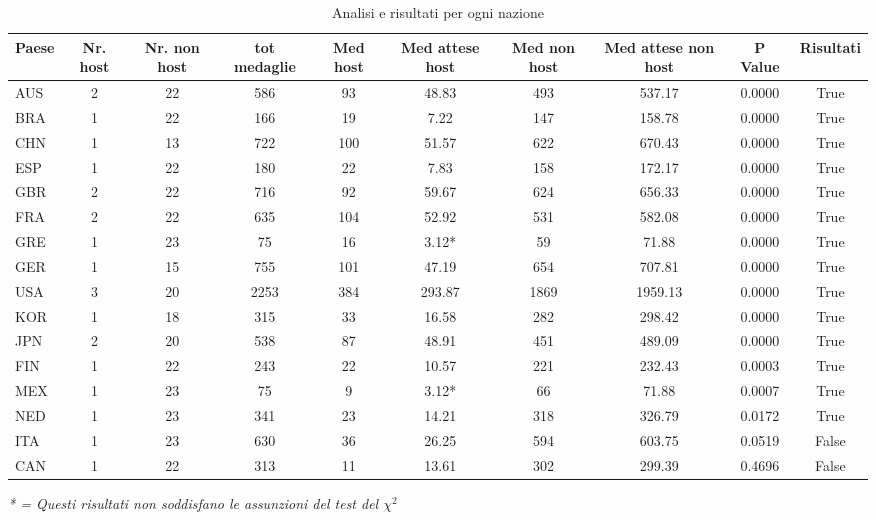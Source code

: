 \documentclass{article}
\begin{document}
\begin{table}[H]
\centering
\caption{Analisi e risultati per ogni nazione}
\label{tab:medaglie_chi2}
\small 
\setlength{\tabcolsep}{2pt} 
\begin{tabularx}{\textwidth}{@{} l *{9}{C} @{}}
\toprule
\textbf{Paese} & \textbf{Nr. host} & \textbf{Nr. non host} & \textbf{tot medaglie} 
& \textbf{Med host} & \textbf{Med attese host} & \textbf{Med non host} & 
\textbf{Med attese non host} & \textbf{P Value} & \textbf{Risultati} \\
\midrule
AUS & 2 & 22 & 586  & 93  & 48.83  & 493  & 537.17 & 0.0000 & True  \\
BRA & 1 & 22 & 166  & 19  & 7.22   & 147  & 158.78 & 0.0000 & True  \\
CHN & 1 & 13 & 722  & 100 & 51.57  & 622  & 670.43 & 0.0000 & True  \\
ESP & 1 & 22 & 180  & 22  & 7.83   & 158  & 172.17 & 0.0000 & True  \\
GBR & 2 & 22 & 716  & 92  & 59.67  & 624  & 656.33 & 0.0000 & True  \\
FRA & 2 & 22 & 635  & 104 & 52.92  & 531  & 582.08 & 0.0000 & True  \\
GRE & 1 & 23 & 75   & 16  & 3.12*  & 59   & 71.88  & 0.0000 & True  \\
GER & 1 & 15 & 755  & 101 & 47.19  & 654  & 707.81 & 0.0000 & True  \\
USA & 3 & 20 & 2253 & 384 & 293.87 & 1869 & 1959.13& 0.0000 & True  \\
KOR & 1 & 18 & 315  & 33  & 16.58  & 282  & 298.42 & 0.0000 & True  \\
JPN & 2 & 20 & 538  & 87  & 48.91  & 451  & 489.09 & 0.0000 & True  \\
FIN & 1 & 22 & 243  & 22  & 10.57  & 221  & 232.43 & 0.0003 & True  \\
MEX & 1 & 23 & 75   & 9   & 3.12*  & 66   & 71.88  & 0.0007 & True  \\
NED & 1 & 23 & 341  & 23  & 14.21  & 318  & 326.79 & 0.0172 & True  \\
ITA & 1 & 23 & 630  & 36  & 26.25  & 594  & 603.75 & 0.0519 & False \\
CAN & 1 & 22 & 313  & 11  & 13.61  & 302  & 299.39 & 0.4696 & False \\
\bottomrule
\end{tabularx}
\vspace{2pt} 
\raggedright 
\scriptsize 
\textit{* = Questi risultati non soddisfano le assunzioni del test del $\chi^2$}
\end{table}
\end{document}
